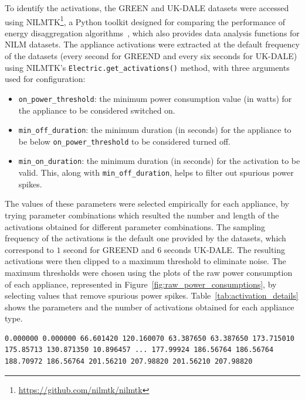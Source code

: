 To identify the activations, the GREEN and UK-DALE datasets were accessed using NILMTK\footnote{\url{https://github.com/nilmtk/nilmtk}}, a Python toolkit designed for comparing the performance of energy disaggregation algorithms~\parencite{batra_nilmtk_2014}, which also provides data analysis functions for NILM datasets. The appliance activations were extracted at the default frequency of the datasets (every second for GREEND and every six seconds for UK-DALE) using NILMTK's \texttt{Electric.get\_activations()} method, with three arguments used for configuration:
\begin{itemize}
    \item \texttt{on\_power\_threshold}: the minimum power consumption value (in watts) for the appliance to be considered switched on.
    \item \texttt{min\_off\_duration}: the minimum duration (in seconds) for the appliance to be below \texttt{on\_power\_threshold} to be considered turned off.
    \item \texttt{min\_on\_duration}: the minimum duration (in seconds) for the activation to be valid. This, along with \texttt{min\_off\_duration}, helps to filter out spurious power spikes. 
\end{itemize}
The values of these parameters were selected empirically for each appliance, by trying parameter combinations which resulted  the number and length of the activations obtained for different parameter combinations. The sampling frequency of the activations is the default one provided by the datasets, which correspond to $1$ second for GREEND and $6$ seconds UK-DALE. The resulting activations were then clipped to a maximum threshold to eliminate noise. The maximum thresholds were chosen using the plots of the raw power consumption of each appliance, represented in Figure~\ref{fig:raw_power_consumptions}, by selecting values that remove spurious power spikes. Table~\ref{tab:activation_details} shows the parameters and the number of activations obtained for each appliance type.

\begin{lstlisting}[language=plain,caption={Example of an activation for the fridge in building 3 of the GREEND dataset. The numbers are samples of the energy consumption (in watts) gathered every second.},label=lst:activation_example,float,floatplacement=H]
0.000000 0.000000 66.601420 120.160070 63.387650 63.387650 173.715010 175.85713 130.871350 10.896457 ... 177.99924 186.56764 186.56764 188.70972 186.56764 201.56210 207.98820 201.56210 207.98820
\end{lstlisting}

